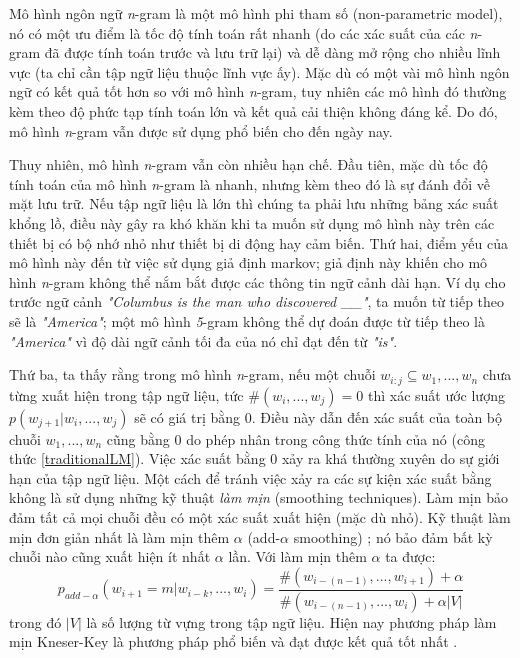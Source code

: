 Mô hình ngôn ngữ \textit{n}-gram là một mô hình phi tham số (non-parametric model), nó có một ưu điểm là tốc độ tính toán rất nhanh (do các xác suất của các \textit{n}-gram đã được tính toán trước và lưu trữ lại) và dễ dàng mở rộng cho nhiều lĩnh vực (ta chỉ cần tập ngữ liệu thuộc lĩnh vực ấy). Mặc dù có một vài mô hình ngôn ngữ có kết quả tốt hơn so với mô hình \textit{n}-gram, tuy nhiên các mô hình đó thường kèm theo độ phức tạp tính toán lớn và kết quả cải thiện không đáng kể. Do đó, mô hình \textit{n}-gram vẫn được sử dụng phổ biến cho đến ngày nay.

Thuy nhiên, mô hình \textit{n}-gram vẫn còn nhiều hạn chế. Đầu tiên, mặc dù tốc độ tính toán của mô hình \textit{n}-gram là nhanh, nhưng kèm theo đó là sự đánh đổi về mặt lưu trữ. Nếu tập ngữ liệu là lớn thì chúng ta phải lưu những bảng xác suất khổng lồ, điều này gây ra khó khăn khi ta muốn sử dụng mô hình này trên các thiết bị có bộ nhớ nhỏ như thiết bị di động hay cảm biến. Thứ hai, điểm yếu của mô hình này đến từ việc sử dụng giả định markov; giả định này khiến cho mô hình \textit{n}-gram không thể nắm bắt được các thông tin ngữ cảnh dài hạn. Ví dụ cho trước ngữ cảnh \textit{"Columbus is the man who discovered \_\_"}, ta muốn từ tiếp theo sẽ là \textit{"America"}; một mô hình \textit{5}-gram không thể dự đoán được từ tiếp theo là \textit{"America"} vì độ dài ngữ cảnh tối đa của nó chỉ đạt đến từ \textit{"is"}.

Thứ ba, ta thấy rằng trong mô hình \textit{n}-gram, nếu một chuỗi $w_{i:j} \subseteq w_1,...,w_n$ chưa từng xuất hiện trong tập ngữ liệu, tức $\# \left(w_i,...,w_j \right) = 0$ thì xác suất ước lượng $p(w_{j+1}|w_i,...,w_j)$ sẽ có giá trị bằng 0. Điều này dẫn đến xác suất của toàn bộ chuỗi $w_1,...,w_n$ cũng bằng 0 do phép nhân trong công thức tính của nó (công thức \ref{traditionalLM}). Việc xác suất bằng 0 xảy ra khá thường xuyên do sự giới hạn của tập ngữ liệu. Một cách để tránh việc xảy ra các sự kiện xác suất bằng không là sử dụng những kỹ thuật \textit{làm mịn} (smoothing techniques). Làm mịn bảo đảm tất cả mọi chuỗi đều có một xác suất xuất hiện (mặc dù nhỏ). Kỹ thuật làm mịn đơn giản nhất là làm mịn thêm $\alpha$ (add-$\alpha$ smoothing) \cite{goodman2001}; nó bảo đảm bất kỳ chuỗi nào cũng xuất hiện ít nhất $\alpha$ lần. Với làm mịn thêm $\alpha$ ta được:
\begin{equation} \label{ngramLMWithSmoothing}
	p_{add-\alpha} \left(w_{i+1}=m|w_{i-k},...,w_{i} \right) = \frac{\# \left(w_{i-(n-1)},...,w_{i+1} \right) + \alpha}{\# \left(w_{i-(n-1)},...,w_{i} \right) + \alpha \left|V \right| }
\end{equation}
trong đó $\left|V \right|$ là số lượng từ vựng trong tập ngữ liệu. Hiện nay phương pháp làm mịn Kneser-Key là phương pháp phổ biến và đạt được kết quả tốt nhất \cite{jurafsky2000}.

